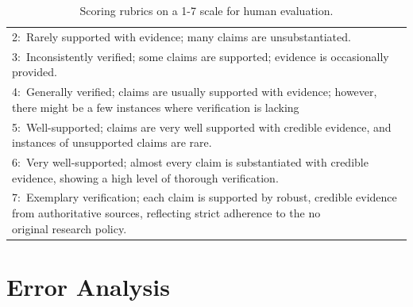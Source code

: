 \begin{table}
{\begin{tabular}{l}
2:~Rarely supported with evidence; many claims are unsubstantiated.                                                                                                                          \\
3:~Inconsistently verified; some claims are supported; evidence is occasionally provided.                                                                                                    \\
4:~Generally verified; claims are usually supported with evidence; however, there might be a few instances where verification is lacking                                                     \\
5:~Well-supported; claims are very well supported with credible evidence, and instances of unsupported claims are rare.                                                                      \\
6:~Very well-supported; almost every claim is substantiated with credible evidence, showing a high level of thorough verification.                                                           \\
\makecell[l]{7:~Exemplary verification; each claim is supported by robust, credible evidence from authoritative sources, reflecting strict adherence to the no \\original research policy.}                  \\
\bottomrule
\end{tabular}
}
\caption{Scoring rubrics on a 1-7 scale for human evaluation.}
\label{table:human_eval_rubric}
\end{table}



\section{Error Analysis}
\label{appendix:error_analysis}

